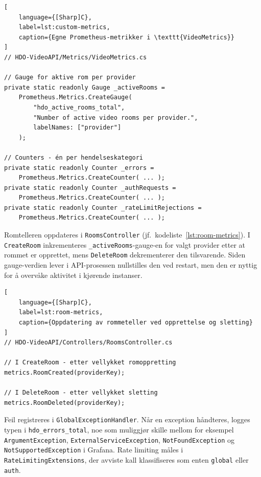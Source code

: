 \begin{lstlisting}[
    language={[Sharp]C},
    label=lst:custom-metrics,
    caption={Egne Prometheus-metrikker i \texttt{VideoMetrics}}
]
// HDO-VideoAPI/Metrics/VideoMetrics.cs

// Gauge for aktive rom per provider
private static readonly Gauge _activeRooms =
    Prometheus.Metrics.CreateGauge(
        "hdo_active_rooms_total",
        "Number of active video rooms per provider.",
        labelNames: ["provider"]
    );

// Counters - én per hendelseskategori
private static readonly Counter _errors =
    Prometheus.Metrics.CreateCounter( ... );
private static readonly Counter _authRequests =
    Prometheus.Metrics.CreateCounter( ... );
private static readonly Counter _rateLimitRejections =
    Prometheus.Metrics.CreateCounter( ... );
\end{lstlisting}


Romtelleren oppdateres i \texttt{RoomsController} (jf.\ kodeliste~\ref{lst:room-metrics}). I \texttt{CreateRoom} inkrementeres \texttt{\_activeRooms}-gauge-en for valgt provider etter at rommet er opprettet, mens \texttt{DeleteRoom} dekrementerer den tilsvarende. Siden gauge-verdien lever i API-prosessen nullstilles den ved restart, men den er nyttig for å overvåke aktivitet i kjørende instanser.

\begin{lstlisting}[
    language={[Sharp]C},
    label=lst:room-metrics,
    caption={Oppdatering av rommeteller ved opprettelse og sletting}
]
// HDO-VideoAPI/Controllers/RoomsController.cs

// I CreateRoom - etter vellykket romoppretting
metrics.RoomCreated(providerKey);

// I DeleteRoom - etter vellykket sletting
metrics.RoomDeleted(providerKey);
\end{lstlisting}

Feil registreres i \texttt{GlobalExceptionHandler}. Når en exception håndteres, logges typen i \texttt{hdo\_errors\_total}, noe som muliggjør skille mellom for eksempel \texttt{ArgumentException}, \texttt{ExternalServiceException}, \texttt{NotFoundException} og \texttt{NotSupportedException} i Grafana. Rate limiting måles i \texttt{RateLimitingExtensions}, der avviste kall klassifiseres som enten \texttt{global} eller \texttt{auth}.

